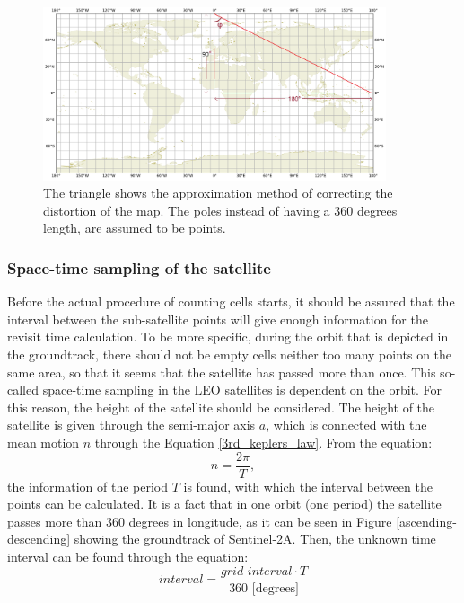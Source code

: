 \begin{figure}
\centering
\includegraphics[width=0.9\textwidth]{Images/correction_map_distortion.png}\caption{The triangle shows the approximation method of correcting the distortion of the map. The poles instead of having a 360 degrees length, are assumed to be points.}
\label{correction_map_distortion}
\end{figure}

\bigskip
\subsubsection{Space-time sampling of the satellite}
\bigskip

Before the actual procedure of counting cells starts, it should be assured that the interval between the sub-satellite points will give enough information for the revisit time calculation. To be more specific, during the orbit that is depicted in the groundtrack, there should not be empty cells neither too many points on the same area, so that it seems that the satellite has passed more than once. This so-called space-time sampling in the LEO satellites is dependent on the orbit. For this reason, the height of the satellite should be considered. The height of the satellite is given through the semi-major axis $a$, which is connected with the mean motion $n$ through the Equation \ref{3rd_keplers_law}. From the equation: $$n = \frac{2 \pi}{T}, $$
the information of the period $T$ is found, with which the interval between the points can be calculated. It is a fact that in one orbit (one period) the satellite passes more than 360 degrees in longitude, as it can be seen in Figure \ref{ascending-descending} showing the groundtrack of Sentinel-2A. Then, the unknown time interval can be found through the equation:
\begin{equation}
\textit{interval} = \frac{\textit{grid interval} \cdot T}{360 \text{ [degrees]}}
\end{equation}

